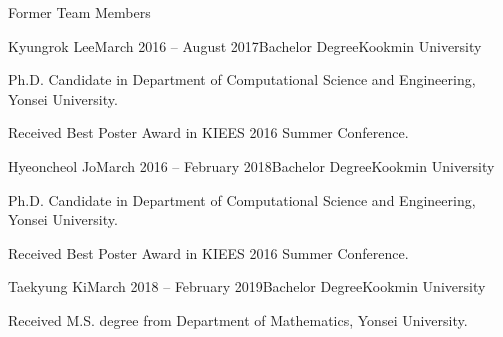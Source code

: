 \documentclass{resume} %
\begin{document}
\begin{rSection}{Former Team Members}
\begin{rSubsection}{Kyungrok Lee}{March 2016 -- August 2017}{Bachelor Degree}{Kookmin University}
\item Ph.D. Candidate in Department of Computational Science and Engineering, Yonsei University.
\item Received Best Poster Award in KIEES 2016 Summer Conference.
\end{rSubsection}

\begin{rSubsection}{Hyeoncheol Jo}{March 2016 -- February 2018}{Bachelor Degree}{Kookmin University}
\item Ph.D. Candidate in Department of Computational Science and Engineering, Yonsei University.
\item Received Best Poster Award in KIEES 2016 Summer Conference.
\end{rSubsection}

\begin{rSubsection}{Taekyung Ki}{March 2018 -- February 2019}{Bachelor Degree}{Kookmin University}
\item Received M.S. degree from Department of Mathematics, Yonsei University.
\end{rSubsection}

\end{rSection}
\end{document}
